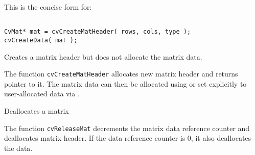 \begin{description}
\end{description}

This is the concise form for:

\begin{lstlisting}

CvMat* mat = cvCreateMatHeader( rows, cols, type );
cvCreateData( mat );

\end{lstlisting}

\label{CreateMatHeader}

Creates a matrix header but does not allocate the matrix data.


\begin{description}
\end{description}

The function \texttt{cvCreateMatHeader} allocates new matrix header and returns pointer to it. The matrix data can then be allocated using  or set explicitly to user-allocated data via .


\label{ReleaseMat}

Deallocates a matrix


\begin{description}
\end{description}


The function \texttt{cvReleaseMat} decrements the matrix data reference counter and deallocates matrix header. If the data reference counter is 0, it also deallocates the data.


